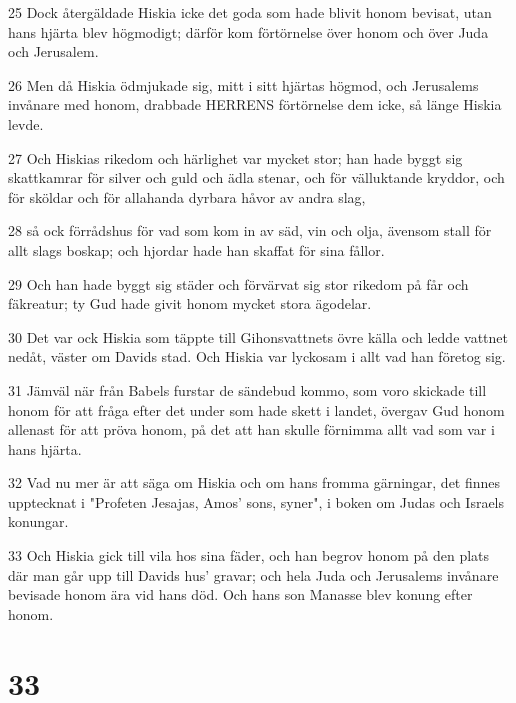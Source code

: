 \par 25 Dock återgäldade Hiskia icke det goda som hade blivit honom bevisat, utan hans hjärta blev högmodigt; därför kom förtörnelse över honom och över Juda och Jerusalem.
\par 26 Men då Hiskia ödmjukade sig, mitt i sitt hjärtas högmod, och Jerusalems invånare med honom, drabbade HERRENS förtörnelse dem icke, så länge Hiskia levde.
\par 27 Och Hiskias rikedom och härlighet var mycket stor; han hade byggt sig skattkamrar för silver och guld och ädla stenar, och för välluktande kryddor, och för sköldar och för allahanda dyrbara håvor av andra slag,
\par 28 så ock förrådshus för vad som kom in av säd, vin och olja, ävensom stall för allt slags boskap; och hjordar hade han skaffat för sina fållor.
\par 29 Och han hade byggt sig städer och förvärvat sig stor rikedom på får och fäkreatur; ty Gud hade givit honom mycket stora ägodelar.
\par 30 Det var ock Hiskia som täppte till Gihonsvattnets övre källa och ledde vattnet nedåt, väster om Davids stad. Och Hiskia var lyckosam i allt vad han företog sig.
\par 31 Jämväl när från Babels furstar de sändebud kommo, som voro skickade till honom för att fråga efter det under som hade skett i landet, övergav Gud honom allenast för att pröva honom, på det att han skulle förnimma allt vad som var i hans hjärta.
\par 32 Vad nu mer är att säga om Hiskia och om hans fromma gärningar, det finnes upptecknat i "Profeten Jesajas, Amos' sons, syner", i boken om Judas och Israels konungar.
\par 33 Och Hiskia gick till vila hos sina fäder, och han begrov honom på den plats där man går upp till Davids hus' gravar; och hela Juda och Jerusalems invånare bevisade honom ära vid hans död. Och hans son Manasse blev konung efter honom.

\chapter{33}

